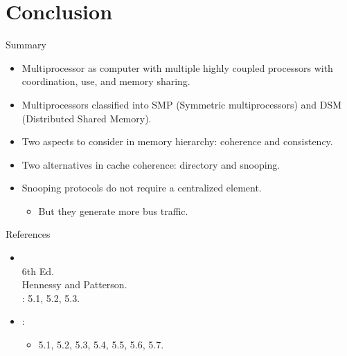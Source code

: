\section{Conclusion}

\begin{frame}[t]{Summary}
\begin{itemize}
  \item Multiprocessor as computer with multiple highly coupled processors with
        coordination, use, and memory sharing.
  \item Multiprocessors classified into SMP (Symmetric multiprocessors) and
        DSM (Distributed Shared Memory).
  \item Two aspects to consider in memory hierarchy: coherence and consistency.
  \item Two alternatives in cache coherence: directory and snooping.
  \item Snooping protocols do not require a centralized element.
    \begin{itemize}
      \item But they generate more bus traffic.
    \end{itemize}
\end{itemize}
\end{frame}


\begin{frame}[t]{References}
\begin{itemize}
  \item {}\\
  6th Ed.\\
  Hennessy and Patterson.\\
  : 5.1, 5.2, 5.3.

  \item {}:
    \begin{itemize}
      \item 5.1, 5.2, 5.3, 5.4, 5.5, 5.6, 5.7.
    \end{itemize}

\end{itemize}
\end{frame}

